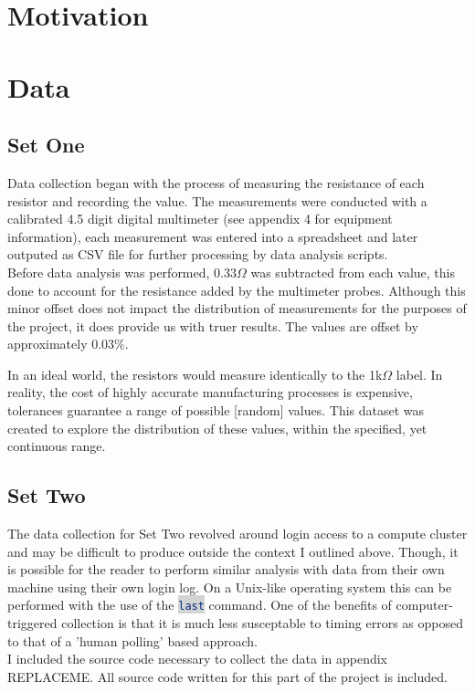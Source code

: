 \documentclass[10pt]{report}
\newcommand{\inlinecode}[2]{\colorbox{lightgray}{\lstinline[language=#1]$#2$}}
\begin{document}
\section*{Motivation}





\section*{Data}

\subsection*{Set One}

Data collection began with the process of measuring the resistance of each resistor
and recording the value. The measurements were conducted with a calibrated 4.5 digit
digital multimeter (see appendix 4 for equipment information), each measurement was entered
into a spreadsheet and later outputed as CSV file for further processing by data analysis scripts. \\
Before data analysis was performed, $0.33\Omega$ was subtracted from each value, this done to account
for the resistance added by the multimeter probes. Although this minor offset does not impact the
distribution of measurements for the purposes of the project, it does provide us with truer results. 
The values are offset by approximately 0.03\%. 

In an ideal world, the resistors would measure identically to the 1k$\Omega$ label. 
In reality, the cost of highly accurate manufacturing processes is expensive, 
tolerances guarantee a range of possible [random] values. This dataset was created to explore 
the distribution of these values, within the specified, yet continuous
range.  

\subsection*{Set Two}

The data collection for Set Two revolved around login access to a compute cluster 
and may be difficult to produce outside the context I outlined above. Though, it is
possible for the reader to perform similar analysis with data from their own machine using 
their own login log. On a Unix-like operating system this can be performed with the use of the 
\inlinecode{Bash}{last} command. One of the benefits of computer-triggered collection is that it 
is much less susceptable to timing errors as opposed to that of a 'human polling' based approach. \\
I included the source code necessary to collect the data in appendix REPLACEME. All source code written 
for this part of the project is included.
\end{document}

